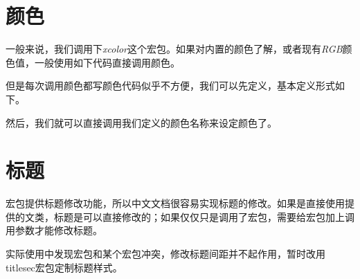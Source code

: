 \begin{latex}
\end{latex}

\section{颜色}
一般来说，我们调用下\emph{xcolor}这个宏包。如果对内置的颜色了解，或者现有\emph{RGB}颜色值，一般使用如下代码直接调用颜色。

\begin{center}
\color[RGB]{204, 128, 92}{Color Text中文测试}
\end{center}

\begin{latex}
\color[RGB]{204, 128, 92}{Color Text中文测试}
\end{latex}

但是每次调用颜色都写颜色代码似乎不方便，我们可以先定义，基本定义形式如下。
\begin{latex}
\usepackage{xcolor}%
\end{latex}

然后，我们就可以直接调用我们定义的颜色名称来设定颜色了。

\begin{center}
\end{center}

\begin{latex}
\color{keyword}{\slshape function, return, if, true, false}
\end{latex}

\section{标题}

\CTeX 宏包提供标题修改功能，所以中文文档很容易实现标题的修改。如果是直接使用\CTeX 提供的文类，标题是可以直接修改的；如果仅仅只是调用了\CTeX 宏包，需要给宏包加上调用参数才能修改标题。

\begin{latex}
\usepackage[
    heading=true,%
]{ctex}
\end{latex}

实际使用中发现\CTeX{}宏包和某个宏包冲突，修改标题间距并不起作用，暂时改用titlesec宏包定制标题样式。



